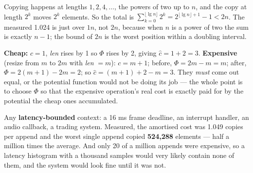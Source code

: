 \begin{ans}
  \item Copying happens at lengths $1, 2, 4, \ldots$, the powers of two up to
        $n$, and the copy at length $2^{k}$ moves $2^{k}$ elements. So the
        total is $\sum_{k=0}^{\lfloor\lg n\rfloor} 2^{k} =
        2^{\lfloor\lg n\rfloor+1}-1 < 2n$. The measured 1.024 is just over
        $1n$, not $2n$, because when $n$ is a power of two the sum is exactly
        $n-1$; the bound of $2n$ is the worst position within a doubling
        interval.
  \item \textbf{Cheap:} $c = 1$, \textit{len} rises by 1 so $\Phi$ rises by 2,
        giving $\hat c = 1 + 2 = 3$. \textbf{Expensive} (resize from $m$ to
        $2m$ with \textit{len} $= m$): $c = m+1$; before,
        $\Phi = 2m - m = m$; after, $\Phi = 2(m{+}1) - 2m = 2$; so
        $\hat c = (m+1) + 2 - m = 3$. They \emph{must} come out equal, or the
        potential function would not be doing its job --- the whole point is to
        choose $\Phi$ so that the expensive operation's real cost is exactly
        paid for by the potential the cheap ones accumulated.
  \item Any \textbf{latency-bounded} context: a 16 ms frame deadline, an
        interrupt handler, an audio callback, a trading system. Measured, the
        amortised cost was 1.049 copies per append and the worst single append
        copied \textbf{524{,}288} elements --- half a million times the
        average. And only 20 of a million appends were expensive, so a
        latency histogram with a thousand samples would very likely contain
        none of them, and the system would look fine until it was not.
\end{ans}

